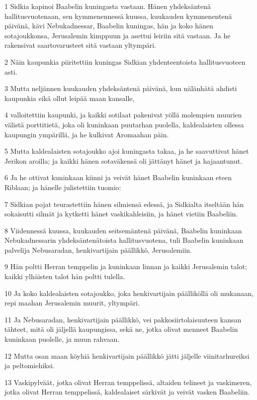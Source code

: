 \par 1 Sidkia kapinoi Baabelin kuningasta vastaan. Hänen yhdeksäntenä hallitusvuotenaan, sen kymmenennessä kuussa, kuukauden kymmenentenä päivänä, kävi Nebukadnessar, Baabelin kuningas, hän ja koko hänen sotajoukkonsa, Jerusalemin kimppuun ja asettui leiriin sitä vastaan. Ja he rakensivat saartovarusteet sitä vastaan yltympäri.
\par 2 Näin kaupunkia piiritettiin kuningas Sidkian yhdenteentoista hallitusvuoteen asti.
\par 3 Mutta neljännen kuukauden yhdeksäntenä päivänä, kun nälänhätä ahdisti kaupunkia eikä ollut leipää maan kansalle,
\par 4 valloitettiin kaupunki, ja kaikki sotilaat pakenivat yöllä molempien muurien välistä porttitietä, joka oli kuninkaan puutarhan puolella, kaldealaisten ollessa kaupungin ympärillä, ja he kulkivat Aromaahan päin.
\par 5 Mutta kaldealaisten sotajoukko ajoi kuningasta takaa, ja he saavuttivat hänet Jerikon aroilla; ja kaikki hänen sotaväkensä oli jättänyt hänet ja hajaantunut.
\par 6 Ja he ottivat kuninkaan kiinni ja veivät hänet Baabelin kuninkaan eteen Riblaan; ja hänelle julistettiin tuomio:
\par 7 Sidkian pojat teurastettiin hänen silmiensä edessä, ja Sidkialta itseltään hän sokaisutti silmät ja kytketti hänet vaskikahleisiin, ja hänet vietiin Baabeliin.
\par 8 Viidennessä kuussa, kuukauden seitsemäntenä päivänä, Baabelin kuninkaan Nebukadnessarin yhdeksäntenätoista hallitusvuotena, tuli Baabelin kuninkaan palvelija Nebusaradan, henkivartijain päällikkö, Jerusalemiin.
\par 9 Hän poltti Herran temppelin ja kuninkaan linnan ja kaikki Jerusalemin talot; kaikki ylhäisten talot hän poltti tulella.
\par 10 Ja koko kaldealaisten sotajoukko, joka henkivartijain päälliköllä oli mukanaan, repi maahan Jerusalemin muurit, yltympäri.
\par 11 Ja Nebusaradan, henkivartijain päällikkö, vei pakkosiirtolaisuuteen kansan tähteet, mitä oli jäljellä kaupungissa, sekä ne, jotka olivat menneet Baabelin kuninkaan puolelle, ja muun rahvaan.
\par 12 Mutta osan maan köyhiä henkivartijain päällikkö jätti jäljelle viinitarhureiksi ja peltomiehiksi.
\par 13 Vaskipylväät, jotka olivat Herran temppelissä, altaiden telineet ja vaskimeren, jotka olivat Herran temppelissä, kaldealaiset särkivät ja veivät vasken Baabeliin.
